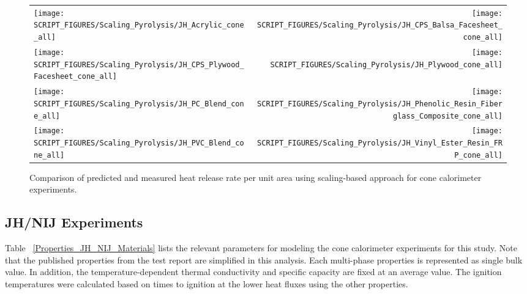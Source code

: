 \begin{figure}[p]
\begin{tabular*}{\textwidth}{l@{\extracolsep{\fill}}r}
\texttt{[image: SCRIPT\_FIGURES/Scaling\_Pyrolysis/JH\_Acrylic\_cone\_all]} &
\texttt{[image: SCRIPT\_FIGURES/Scaling\_Pyrolysis/JH\_CPS\_Balsa\_Facesheet\_cone\_all]} \\
\texttt{[image: SCRIPT\_FIGURES/Scaling\_Pyrolysis/JH\_CPS\_Plywood\_Facesheet\_cone\_all]} &
\texttt{[image: SCRIPT\_FIGURES/Scaling\_Pyrolysis/JH\_Plywood\_cone\_all]} \\
\texttt{[image: SCRIPT\_FIGURES/Scaling\_Pyrolysis/JH\_PC\_Blend\_cone\_all]} &
\texttt{[image: SCRIPT\_FIGURES/Scaling\_Pyrolysis/JH\_Phenolic\_Resin\_Fiberglass\_Composite\_cone\_all]} \\
\texttt{[image: SCRIPT\_FIGURES/Scaling\_Pyrolysis/JH\_PVC\_Blend\_cone\_all]} &
\texttt{[image: SCRIPT\_FIGURES/Scaling\_Pyrolysis/JH\_Vinyl\_Ester\_Resin\_FRP\_cone\_all]} \\
\end{tabular*}
\caption[HRRPUA of JH/FRA materials using scaling model]
{Comparison of predicted and measured heat release rate per unit area using scaling-based approach for cone calorimeter experiments.}
\label{JH_FRA_HRR_materials}
\end{figure}

\clearpage

\subsection{JH/NIJ Experiments}\label{sec_JH_NIJ_Materials}

Table ~\ref{Properties_JH_NIJ_Materials} lists the relevant parameters for modeling the cone calorimeter experiments for this study.
Note that the published properties from the test report are simplified in this analysis. Each multi-phase properties is represented as single bulk value.
In addition, the temperature-dependent thermal conductivity and specific capacity are fixed at an average value.
The ignition temperatures were calculated based on times to ignition at the lower heat fluxes using the other properties.

